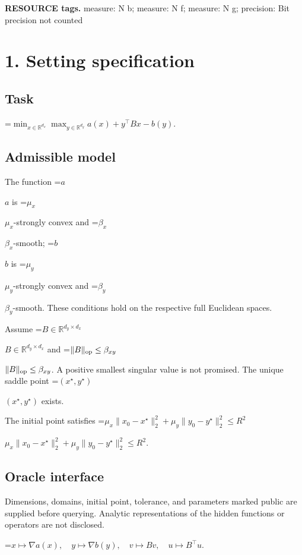 \documentclass[10pt,a4paper]{article}
\newcommand{\AtlasMath}[1]{\par\begingroup\centering\setbox0=\hbox{$\displaystyle #1$}\ifdim\wd0>1.4\linewidth\typeout{ATLAS WIDE FORMULA: \the\wd0}\fi\ifdim\wd0>\linewidth\resizebox{\linewidth}{!}{\box0}\else\box0\fi\par\endgroup}
\newcommand{\AtlasInlineMath}[1]{\begingroup\setbox0=\hbox{$#1$}\ifdim\wd0>.4\linewidth\endgroup\AtlasMath{#1}\else\endgroup$#1$\fi}
\begin{document}
\textbf{RESOURCE tags.} measure: N b; measure: N f; measure: N g; precision: Bit precision not counted



\section{1. Setting specification}


\subsection{Task}



\AtlasMath{\min_{x\in\mathbb{R}^{d_x}}\max_{y\in\mathbb{R}^{d_y}}a(x)+y^\top Bx-b(y).}




\subsection{Admissible model}


The function \AtlasInlineMath{a} is \AtlasInlineMath{\mu_x}-strongly convex and \AtlasInlineMath{\beta_x}-smooth; \AtlasInlineMath{b} is \AtlasInlineMath{\mu_y}-strongly convex and \AtlasInlineMath{\beta_y}-smooth. These conditions hold on the respective full Euclidean spaces.



Assume \AtlasInlineMath{B\in\mathbb{R}^{d_y\times d_x}} and \AtlasInlineMath{\|B\|_{\rm op}\le\beta_{xy}}. A positive smallest singular value is not promised. The unique saddle point \AtlasInlineMath{(x^\star,y^\star)} exists.



The initial point satisfies \AtlasInlineMath{\mu_x\|x_0-x^\star\|_2^2+\mu_y\|y_0-y^\star\|_2^2\le R^2}.



\subsection{Oracle interface}


Dimensions, domains, initial point, tolerance, and parameters marked public are supplied before querying. Analytic representations of the hidden functions or operators are not disclosed.




\AtlasMath{x\mapsto\nabla a(x),\quad y\mapsto\nabla b(y),\quad v\mapsto Bv,\quad u\mapsto B^\top u.}
\end{document}
